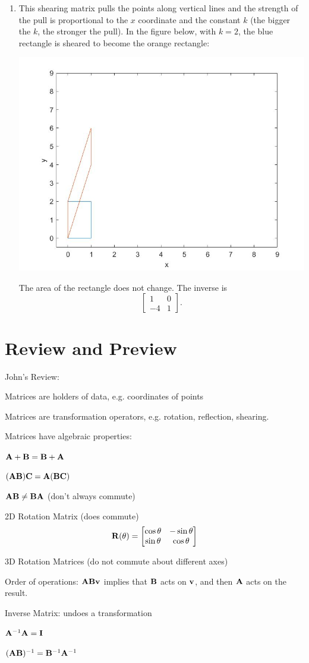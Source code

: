 \begin{sol}
\begin{enumerate}
        \item This shearing matrix pulls the points along vertical lines and the strength of the pull is proportional to the $x$ coordinate and the constant $k$ (the bigger the $k$, the stronger the pull). In the figure below, with $k=2$, the blue rectangle is sheared to become the orange rectangle: 
        \begin{center}
        \includegraphics[width=.75\textwidth]{FacesDay2/figs/bigyshear.jpg}
        \label{fig:bigyshear}
    \end{center}
        The area of the rectangle does not change. The inverse is
    $$\begin{bmatrix}
    1 & 0\\ -4 & 1
    \end{bmatrix}.$$
\end{enumerate}
\end{sol}

\section*{Review and Preview}
\begin{ournotes}
John's Review:
\bi
\item Matrices are holders of data, e.g. coordinates of points
\item Matrices are transformation operators, e.g. rotation, reflection, shearing.
\item Matrices have algebraic properties:
\bi
\item $\mathbf{A} + \mathbf{B} = \mathbf{B} + \mathbf{A}$
\item $(\mathbf{A} \mathbf{B})\mathbf{C} = \mathbf{A} (\mathbf{B} \mathbf{C})$
\item $\mathbf{A} \mathbf{B} \ne \mathbf{B} \mathbf{A}$ (don't always commute)
\ei
\item 2D Rotation Matrix (does commute)
\[\mathbf{R}(\theta) = \begin{bmatrix} \cos \theta & -\sin \theta \\ \sin \theta & \cos \theta\end{bmatrix}\]
\item 3D Rotation Matrices (do not commute about different axes)
\item Order of operations:
$\mathbf{A} \mathbf{B} \mathbf{v}$ implies that $\mathbf{B}$ acts on $\mathbf{v}$, and then $\mathbf{A}$ acts on the result.
\item Inverse Matrix: undoes a transformation
\bi
\item $\mathbf{A}^{-1} \mathbf{A} = \mathbf{I}$
\item $(\mathbf{A} \mathbf{B})^{-1} = \mathbf{B}^{-1} \mathbf{A}^{-1}$
\ei
\ei
\end{ournotes}

